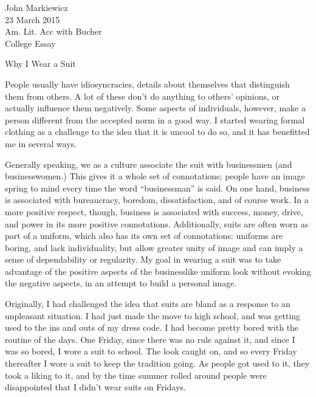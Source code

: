 \documentclass[12pt]{article}
\begin{document}
\begin{raggedleft}
	John Markiewicz\\
	23 March 2015\\ 
	Am. Lit. Acc with Bucher\\
	College Essay\\
\end{raggedleft}
\begin{center}
	Why I Wear a Suit
\end{center}
\doublespacing

	People usually have idiosyncracies, details about themselves
	that distinguish them from others.  A lot of these don't do
	anything to others' opinions, or actually influence them 
	negatively.  Some aspects of individuals, however, make
	a person different from the accepted norm in a good way.  I
	started wearing formal clothing as a challenge to the idea
	that it is uncool to do so, and it has benefitted me in 
	several ways.

	Generally speaking, we as a culture associate the suit
	with businessmen (and businesswomen.)  This gives it a whole
	set of connotations; people have an image spring to mind
	every time the word ``businessman'' is said.
	On one hand, business is associated with bureaucracy, 
	boredom, dissatisfaction, and of course work.  In a more
	positive respect, though, business is associated with success, 
	money, drive, and power in its more positive connotations.
	Additionally, suits are often worn as part of a uniform,
	which also has its own set of connotations: uniforms are 
	boring, and lack individuality, but allow greater unity
	of image and can imply a sense of dependability or regularity.
	My goal in wearing a suit was to take advantage of the
	positive aspects of the businesslike uniform look without 
	evoking the negative aspects, in an attempt to build a
	personal image.

	Originally, I had challenged the idea that suits are bland
	as a response to an unpleasant situation.  I had just made the
	move to high school, and was getting used to the ins and
	outs of my dress code.  I had become pretty bored with the
	routine of the days.  One Friday, since there was no rule
	against it, and since I was so bored, I wore a suit to school.
	The look caught on,	and so every Friday thereafter I wore a
	suit to keep the tradition going.  As people got used to it,
	they took a liking to it, and by the time summer rolled 
	around people were disappointed that I didn't wear suits
	on Fridays.
\end{document}
